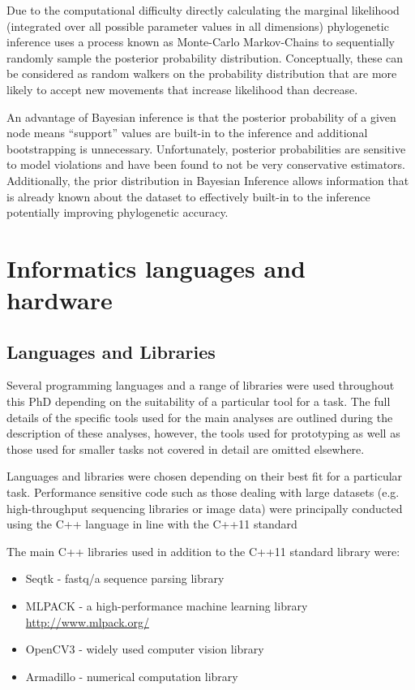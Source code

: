 Due to the computational difficulty directly calculating the marginal likelihood 
(integrated over all possible parameter values in all dimensions) phylogenetic inference uses 
a process known as Monte-Carlo Markov-Chains to sequentially randomly sample
the posterior probability distribution.  Conceptually, these can be considered
as random walkers on the probability distribution that are more likely to accept
new movements that increase likelihood than decrease.

An advantage of Bayesian inference is that the posterior probability of a given
node means ``support'' values are built-in to the inference and additional
bootstrapping is unnecessary.  Unfortunately, posterior probabilities are
sensitive to model violations and have been found to not be very conservative estimators.
Additionally, the prior distribution in Bayesian Inference allows information
that is already known about the dataset to effectively built-in to the inference
potentially improving phylogenetic accuracy.


\section{Informatics languages and hardware}

\subsection{Languages and Libraries} 
Several programming languages and a range of libraries were used throughout this PhD depending
on the suitability of a particular tool for a task.
The full details of the specific tools used for the main analyses are outlined during the description
of these analyses, however, the tools used for prototyping as well as those used for smaller tasks not covered
in detail are omitted elsewhere. 

Languages and libraries were chosen depending on their best fit for a particular task.
Performance sensitive code such as those dealing with large datasets (e.g. high-throughput sequencing 
libraries or image data) were principally conducted using the C++ language 
in line with the C++11 standard \citep{ISOInternationalStandard2011}

The main C++ libraries used in addition to the C++11 standard library were:
\begin{itemize}
    \item Seqtk - fastq/a sequence parsing library \citep{SeqtkGitHub}
    \item MLPACK - a high-performance machine learning library \url{http://www.mlpack.org/} \citep{mlpack2013}
    \item OpenCV3 - widely used computer vision library \citep{opencv_library}
    \item Armadillo - numerical computation library \citep{Sanderson2010}
\end{itemize}

